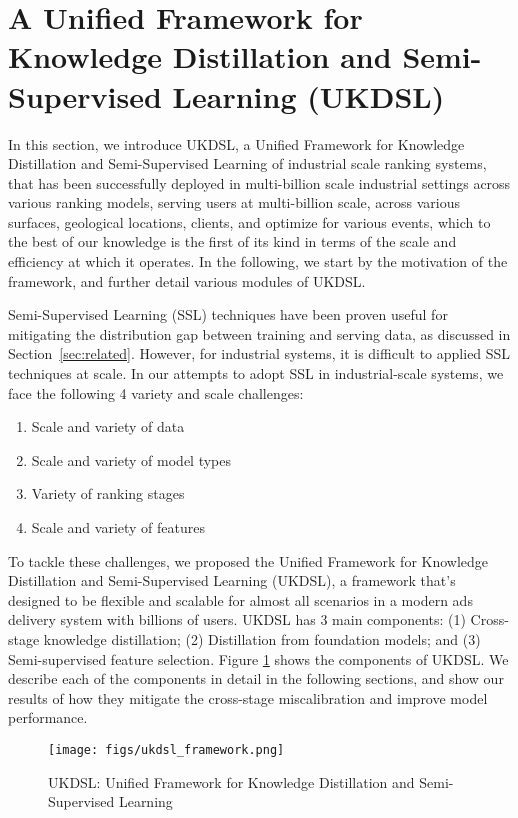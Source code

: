 \section{A Unified Framework for Knowledge Distillation and Semi-Supervised Learning (UKDSL)}
\label{sec:method}

In this section, we introduce UKDSL, a Unified Framework for Knowledge Distillation and Semi-Supervised Learning of industrial scale ranking systems, that has been successfully deployed in multi-billion scale industrial settings across various ranking models, serving users at multi-billion scale, across various surfaces, geological locations, clients, and optimize for various events, which to the best of our knowledge is the first of its kind in terms of the scale and efficiency at which it operates. 
In the following, we start by the motivation of the framework, and further detail various modules of UKDSL.


Semi-Supervised Learning (SSL) techniques have been proven useful for mitigating the distribution gap between training and serving data, as discussed in Section~\ref{sec:related}. 
However, for industrial systems, it is difficult to applied SSL techniques at scale. In our attempts to adopt SSL in industrial-scale systems, we face the following 4 variety and scale challenges:
\newline

\begin{enumerate}
    \item Scale and variety of data 
    \item Scale and variety of model types
    \item Variety of ranking stages
    \item Scale and variety of features
\end{enumerate}
\vspace{6pt}
To tackle these challenges, we proposed the Unified Framework for Knowledge Distillation and Semi-Supervised Learning (UKDSL), a framework that's designed to be flexible and scalable for almost all scenarios in a modern ads delivery system with billions of users. UKDSL has 3 main components: (1) Cross-stage knowledge distillation; (2) Distillation from foundation models; and (3) Semi-supervised feature selection. Figure \ref{fig:ukdsl} shows the components of UKDSL. We describe each of the components in detail in the following sections, and show our results of how they mitigate the cross-stage miscalibration and improve model performance.

\begin{figure}[t]
  \centering
   \texttt{[image: figs/ukdsl\_framework.png]}
  \caption{UKDSL: Unified Framework for Knowledge Distillation and Semi-Supervised Learning}
  \label{fig:ukdsl}
\end{figure}










